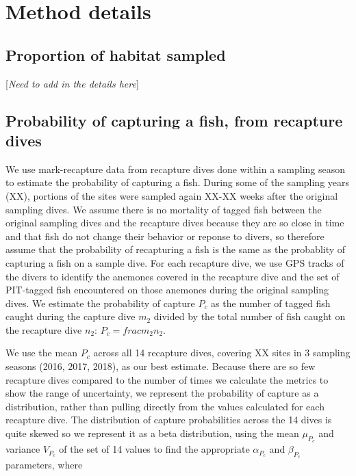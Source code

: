 \documentclass[12pt, oneside]{article}   	%
\begin{document}
\section{Method details}
\subsection*{Proportion of habitat sampled} \label{APP_SEC_ProbHabSampled}
[\textit{Need to add in the details here}]

\newpage{}

\subsection*{Probability of capturing a fish, from recapture dives} \label{APP_SEC_ProbR}

We use mark-recapture data from recapture dives done within a sampling season to estimate the probability of capturing a fish. During some of the sampling years (XX), portions of the sites were sampled again XX-XX weeks after the original sampling dives. We assume there is no mortality of tagged fish between the original sampling dives and the recapture dives because they are so close in time and that fish do not change their behavior or reponse to divers, so therefore assume that the probability of recapturing a fish is the same as the probablity of capturing a fish on a sample dive. For each recapture dive, we use GPS tracks of the divers to identify the anemones covered in the recapture dive and the set of PIT-tagged fish encountered on those anemones during the original sampling dives. We estimate the probability of capture $P_c$ as the number of tagged fish caught during the capture dive $m_2$ divided by the total number of fish caught on the recapture dive $n_2$: $P_c = frac{m_2}{n_2}$. 

We use the mean $P_c$ across all 14 recapture dives, covering XX sites in 3 sampling seasons (2016, 2017, 2018), as our best estimate. Because there are so few recapture dives compared to the number of times we calculate the metrics to show the range of uncertainty, we represent the probability of capture as a distribution, rather than pulling directly from the values calculated for each recapture dive. The distribution of capture probabilities across the 14 dives is quite skewed so we represent it as a beta distribution, using the mean $\mu_{P_c}$ and variance $V_{P_c}$ of the set of 14 values to find the appropriate $\alpha_{P_c}$ and $\beta_{P_c}$ parameters, where 
\end{document}
